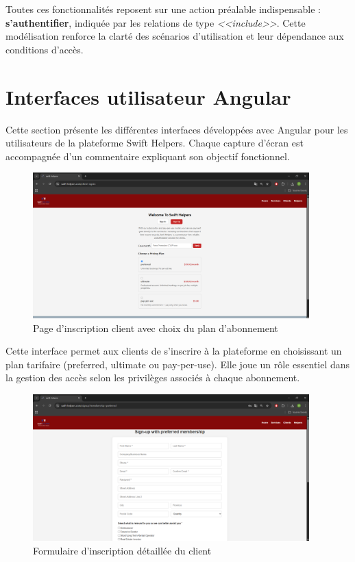 Toutes ces fonctionnalités reposent sur une action préalable indispensable : \textbf{s’authentifier}, indiquée par les relations de type \textit{<<include>>}. Cette modélisation renforce la clarté des scénarios d’utilisation et leur dépendance aux conditions d’accès.

\section{Interfaces utilisateur Angular}

Cette section présente les différentes interfaces développées avec Angular pour les utilisateurs de la plateforme Swift Helpers. Chaque capture d’écran est accompagnée d’un commentaire expliquant son objectif fonctionnel.

\begin{figure}[H]
    \centering
    \includegraphics[width=0.95\textwidth]{figures/gestion de compte client.png}
    \caption{Page d'inscription client avec choix du plan d'abonnement}
\end{figure}

\noindent
Cette interface permet aux clients de s’inscrire à la plateforme en choisissant un plan tarifaire (preferred, ultimate ou pay-per-use). Elle joue un rôle essentiel dans la gestion des accès selon les privilèges associés à chaque abonnement.

\vspace{0.5cm}

\begin{figure}[H]
    \centering
    \includegraphics[width=0.95\textwidth]{figures/inscription client.png}
    \caption{Formulaire d’inscription détaillée du client}
\end{figure}

